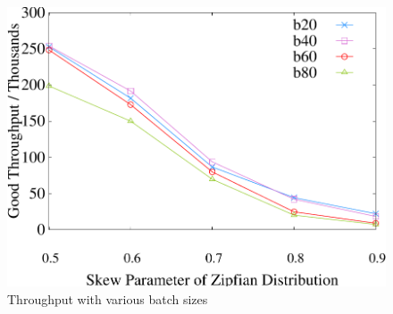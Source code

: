 \begin{figure}[t]
\begin{minipage}[b]{0.32\linewidth}
    \end{minipage}
    \begin{minipage}[b]{0.32\linewidth}
            \centering
            \includegraphics[width=\textwidth]{./exp_fig/bsize/tps}
            \vspace{-2em}
            \caption{Throughput with various batch sizes}
            \label{fig:bsize:tps}
    \end{minipage}    
    \vspace{-1em}
\end{figure}

